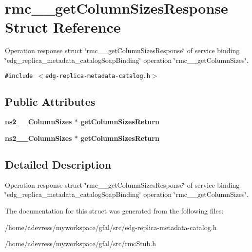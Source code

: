 \section{rmc\_\-\_\-get\-Column\-Sizes\-Response Struct Reference}
\label{structrmc____getColumnSizesResponse}
Operation response struct \char`\"{}rmc\_\-\_\-get\-Column\-Sizes\-Response\char`\"{} of service binding \char`\"{}edg\_\-replica\_\-metadata\_\-catalog\-Soap\-Binding\char`\"{} operation \char`\"{}rmc\_\-\_\-get\-Column\-Sizes\char`\"{}.  


{\tt \#include $<$edg-replica-metadata-catalog.h$>$}

\subsection*{Public Attributes}
\begin{CompactItemize}
\item 
\bf{ns2\_\-\_\-Column\-Sizes} $\ast$ \textbf{get\-Column\-Sizes\-Return}\label{structrmc____getColumnSizesResponse_cc84010bf36d80d5bb74d6c00973d0e2}

\item 
\bf{ns2\_\-\_\-Column\-Sizes} $\ast$ \textbf{get\-Column\-Sizes\-Return}\label{structrmc____getColumnSizesResponse_cc84010bf36d80d5bb74d6c00973d0e2}

\end{CompactItemize}


\subsection{Detailed Description}
Operation response struct \char`\"{}rmc\_\-\_\-get\-Column\-Sizes\-Response\char`\"{} of service binding \char`\"{}edg\_\-replica\_\-metadata\_\-catalog\-Soap\-Binding\char`\"{} operation \char`\"{}rmc\_\-\_\-get\-Column\-Sizes\char`\"{}. 



The documentation for this struct was generated from the following files:\begin{CompactItemize}
\item 
/home/adevress/myworkspace/gfal/src/edg-replica-metadata-catalog.h\item 
/home/adevress/myworkspace/gfal/src/rmc\-Stub.h\end{CompactItemize}
